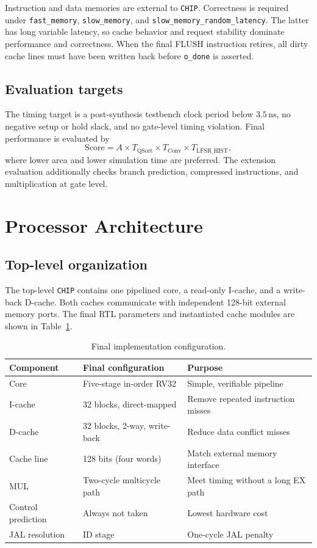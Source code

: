 \documentclass[11pt,a4paper]{article}
\newcommand{\SI}[2]{\ensuremath{#1\,\mathrm{#2}}}
\begin{document}
Instruction and data memories are external to \texttt{CHIP}.  Correctness is
required under \texttt{fast\_memory}, \texttt{slow\_memory}, and
\texttt{slow\_memory\_random\_latency}.  The latter has long variable latency,
so cache behavior and request stability dominate performance and correctness.
When the final FLUSH instruction retires, all dirty cache lines must have been
written back before \texttt{o\_done} is asserted.

\subsection{Evaluation targets}
The timing target is a post-synthesis testbench clock period below
\SI{3.5}{ns}, no negative setup or hold slack, and no gate-level timing
violation.  Final performance is evaluated by
\[
  \text{Score} =
  A \times T_{\text{QSort}} \times T_{\text{Conv}} \times T_{\text{LFSR\_HIST}},
\]
where lower area and lower simulation time are preferred.  The extension
evaluation additionally checks branch prediction, compressed instructions, and
multiplication at gate level.

\section{Processor Architecture}

\subsection{Top-level organization}
The top-level \texttt{CHIP} contains one pipelined core, a read-only I-cache,
and a write-back D-cache.  Both caches communicate with independent 128-bit
external memory ports.  The final RTL parameters and instantiated cache modules
are shown in Table~\ref{tab:final-config}.

\begin{table}[h]
\centering
\caption{Final implementation configuration.}
\label{tab:final-config}
\begin{tabular}{lll}
\toprule
Component & Final configuration & Purpose\\
\midrule
Core & Five-stage in-order RV32 & Simple, verifiable pipeline\\
I-cache & 32 blocks, direct-mapped & Remove repeated instruction misses\\
D-cache & 32 blocks, 2-way, write-back & Reduce data conflict misses\\
Cache line & 128 bits (four words) & Match external memory interface\\
MUL & Two-cycle multicycle path & Meet timing without a long EX path\\
Control prediction & Always not taken & Lowest hardware cost\\
JAL resolution & ID stage & One-cycle JAL penalty\\
\bottomrule
\end{tabular}
\end{table}
\end{document}
